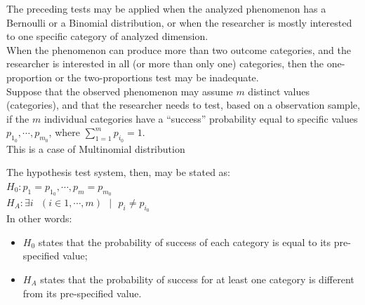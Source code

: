 
\begin{frame}
  \vspace{0.25cm}
  The preceding tests may be applied when the analyzed phenomenon has a Bernoulli or a Binomial distribution, or when the researcher is mostly interested to one specific category of analyzed dimension.\\
  \vspace{0.35cm}
  When the phenomenon can produce more than two outcome categories, and the researcher is interested in all (or more than only one) categories, then the one-proportion or the two-proportions test may be inadequate.\\
  \vspace{0.35cm}
  Suppose that the observed phenomenon may assume $m$ distinct values (categories), and that the researcher needs to test, based on a observation sample, if the $m$ individual categories have a ``success'' probability equal to specific values $p_{1_0}, \cdots, p_{m_0}$, where $\sum_{1=1}^m p_{i_0}=1$.\\
  \vspace{0.25cm}
  This is a case of Multinomial distribution
\end{frame}


\begin{frame}
  \vspace{0.25cm}
  The hypothesis test system, then, may be stated as:\\
  \vspace{0.25cm}
  $H_0: p_1=p_{1_0}, \cdots, p_m=p_{m_0}$\\
  $H_A: \exists i \mbox{ } (i \in 1, \cdots, m) \mbox{ }  | \mbox{ }  p_i \neq p_{i_0}$\\
  \vspace{0.75cm}
  In other words:
  \begin{itemize}
    \item $H_0$ states that the probability of success of each category is equal to its pre-specified value;
    \vspace{0.25cm}
  \item $H_A$ states that the probability of success for at least one category is different from its pre-specified value.
  \end{itemize}
\end{frame}


